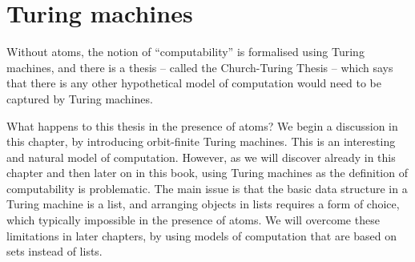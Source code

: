 
\chapter{Turing machines}
\label{cha:turing}
Without atoms, the notion of ``computability'' is formalised using Turing machines, and there is a thesis -- called the Church-Turing Thesis -- which says that there is any other hypothetical model of computation would need to be captured by Turing machines. 

What happens to this thesis in the presence of atoms? We begin a discussion in this chapter, by introducing orbit-finite Turing machines. This is an interesting and natural model of computation. However, as we will discover already in this chapter and then later on in this book,  using Turing machines as the definition of computability is problematic.  The main issue is that the basic data structure in a Turing machine is a list, and arranging objects in lists requires a form of choice, which typically impossible in the presence of atoms.  We will overcome these limitations in later chapters, by using models of computation that are based on sets instead of lists.

